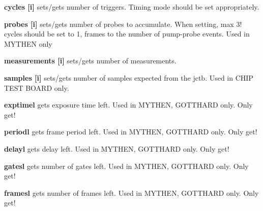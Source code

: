 \begin{DoxyItemize}
\item {\bfseries cycles \mbox{[}i\mbox{]}} sets/gets number of triggers. Timing mode should be set appropriately.
\end{DoxyItemize}


\begin{DoxyItemize}
\item {\bfseries probes \mbox{[}i\mbox{]}} sets/gets number of probes to accumulate. When setting, max 3! cycles should be set to 1, frames to the number of pump-\/probe events. Used in MYTHEN only
\end{DoxyItemize}


\begin{DoxyItemize}
\item {\bfseries measurements \mbox{[}i\mbox{]}} sets/gets number of measurements.
\end{DoxyItemize}


\begin{DoxyItemize}
\item {\bfseries samples \mbox{[}i\mbox{]}} sets/gets number of samples expected from the jctb. Used in CHIP TEST BOARD only.
\end{DoxyItemize}


\begin{DoxyItemize}
\item {\bfseries exptimel} gets exposure time left. Used in MYTHEN, GOTTHARD only. Only get!
\end{DoxyItemize}


\begin{DoxyItemize}
\item {\bfseries periodl} gets frame period left. Used in MYTHEN, GOTTHARD only. Only get!
\end{DoxyItemize}


\begin{DoxyItemize}
\item {\bfseries delayl} gets delay left. Used in MYTHEN, GOTTHARD only. Only get!
\end{DoxyItemize}


\begin{DoxyItemize}
\item {\bfseries gatesl} gets number of gates left. Used in MYTHEN, GOTTHARD only. Only get!
\end{DoxyItemize}


\begin{DoxyItemize}
\item {\bfseries framesl} gets number of frames left. Used in MYTHEN, GOTTHARD only. Only get!
\end{DoxyItemize}


